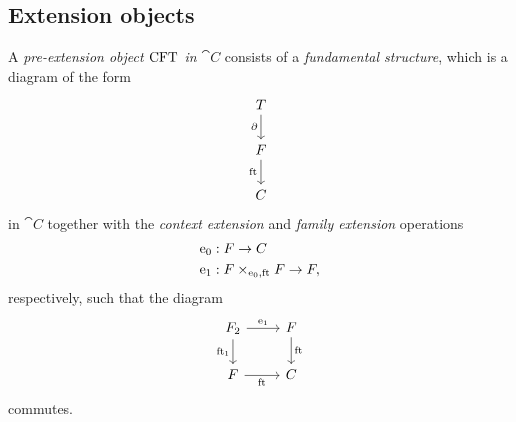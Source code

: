 \subsection{Extension objects}
\begin{defn}
A \emph{pre-extension object $\mathrm{CFT}$ in $\cat{C}$} consists of a \emph{fundamental structure}, which is a diagram of the form
\begin{equation*}
\begin{tikzcd}
\stesyst
  \ar{d}[swap]{\ebd}
  \\
\stesysf
  \ar{d}[swap]{\eft}
  \\
\stesysc
\end{tikzcd}
\end{equation*}
in $\cat{C}$ together with the \emph{context extension} and \emph{family extension} operations
\begin{align*}
\ectxext &:\stesysf\to \stesysc\\
\efamext & :\stesysff\to \stesysf,
\end{align*}
respectively, such that the diagram
\begin{equation*}
\begin{tikzcd}
\stesysf_2 
  \ar{r}{\efamext} 
  \ar{d}[swap]{\eft[1]} 
  & 
\stesysf 
  \ar{d}{\eft}
  \\
\stesysf
  \ar{r}[swap]{\eft} 
  & 
\stesysc
\end{tikzcd}
\end{equation*}
commutes.
\end{defn}


